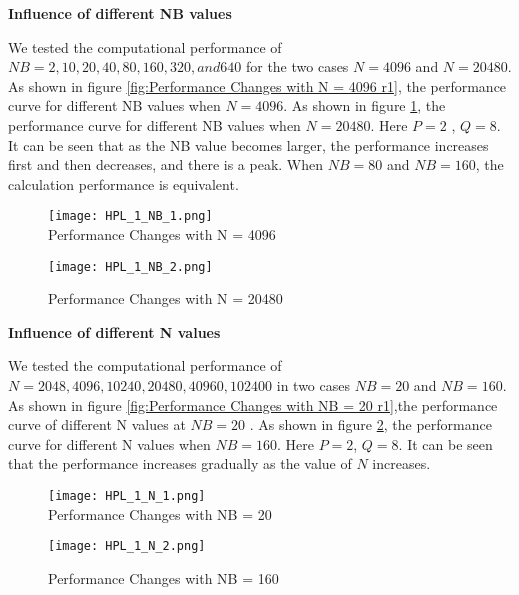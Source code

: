 \documentclass{mcmthesis}
\begin{document}
\textbf{Influence of different NB values}


\par We tested the computational performance of $NB = 2, 10, 20, 40, 80, 160, 320, and 640$ for the two cases $N = 4096$ and $N = 20480$. As shown in figure  \ref{fig:Performance Changes with N = 4096 r1}, the performance curve for different NB values when $N = 4096$. As shown in figure \ref{fig:Performance Changes with N = 20480 r1}, the performance curve for different NB values when $N = 20480$. Here $P=2$ , $Q=8$. It can be seen that as the NB value becomes larger, the performance increases first and then decreases, and there is a peak. When $NB=80$ and $NB=160$, the calculation performance is equivalent.


\begin{figure}[htbp]  
\begin{minipage}[t]{0.5\textwidth}
\centering  
\texttt{[image: HPL\_1\_NB\_1.png]} \\
\caption{Performance Changes with N = 4096} \label{fig:Performance Changes with N = 4096 r1}
\end{minipage}
\hspace{1ex}
\begin{minipage}[t]{0.5\textwidth}  
\centering  
\texttt{[image: HPL\_1\_NB\_2.png]}\\
\caption{Performance Changes with N = 20480}  \label{fig:Performance Changes with N = 20480 r1}
\end{minipage}  
\end{figure} 


\textbf{Influence of different N values}

\par We tested the computational performance of $N = 2048, 4096, 10240, 20480, 40960, 102400 $ in two cases $NB = 20$ and $NB = 160$. As shown in figure \ref{fig:Performance Changes with NB = 20 r1},the performance curve of different N values at  $NB = 20$ . As shown in figure \ref{fig:Performance Changes with NB = 160 r1}, the performance curve for different N values when $NB = 160$. Here $P=2$, $Q= 8$. It can be seen that the performance increases gradually as the value of $N$ increases.

\begin{figure}[htbp]  
\begin{minipage}[t]{0.5\textwidth}
\centering  
\texttt{[image: HPL\_1\_N\_1.png]} \\
\caption{Performance Changes with NB = 20} \label{fig:Performance Changes with NB = 20 r1}
\end{minipage}
\hspace{1ex}
\begin{minipage}[t]{0.5\textwidth}  
\centering  
\texttt{[image: HPL\_1\_N\_2.png]}\\
\caption{Performance Changes with NB = 160}  \label{fig:Performance Changes with NB = 160 r1}
\end{minipage}  
\end{figure} 
\end{document}
